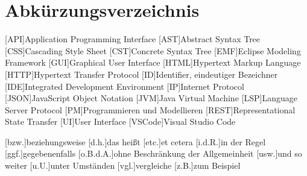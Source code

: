\chapter*{Abkürzungsverzeichnis}


\begin{acronym}[XXXXXX]
    [API]{Application Programming Interface}
    [AST]{Abstract Syntax Tree}
    [CSS]{Cascading Style Sheet}
    [CST]{Concrete Syntax Tree}
    [EMF]{Eclipse Modeling Framework}
    [GUI]{Graphical User Interface}
    [HTML]{Hypertext Markup Language}
    [HTTP]{Hypertext Transfer Protocol}
    [ID]{Identifier, eindeutiger Bezeichner}
    [IDE]{Integrated Development Environment}
    [IP]{Internet Protocol}
    [JSON]{JavaScript Object Notation}
    [JVM]{Java Virtual Machine}
    [LSP]{Language Server Protocol}
    [PM]{Programmieren und Modellieren}
    [REST]{Representational State Transfer}
    [UI]{User Interface}
    [VSCode]{Visual Studio Code}

    [bzw.]{beziehungsweise}
    [d.h.]{das heißt}
    [etc.]{et cetera}
    [i.d.R.]{in der Regel}
    [ggf.]{gegebenenfalls}
    [o.B.d.A.]{ohne Beschränkung der Allgemeinheit}
    [usw.]{und so weiter}
    [u.U.]{unter Umständen}
    [vgl.]{vergleiche}
    [z.B.]{zum Beispiel}
\end{acronym}
